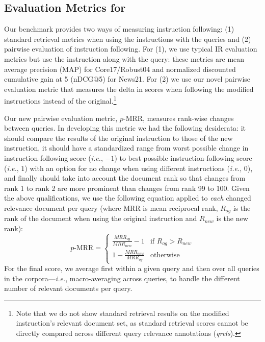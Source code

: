 \documentclass{article} %
\newcommand{\metricrank}{$p$-MRR}
\begin{document}
\subsection{Evaluation Metrics for \dataset}
Our benchmark provides two ways of measuring instruction following: (1) standard retrieval metrics when using the instructions with the queries and (2) pairwise evaluation of instruction following. For (1), we use typical IR evaluation metrics but use the instruction along with the query: these metrics are mean average precision (MAP) for Core17/Robust04 and normalized discounted cumulative gain at 5 (nDCG@5) for News21. For (2) we use our novel pairwise evaluation metric that measures the delta in scores when following the modified instructions instead of the original.\footnote{Note that we do not show standard retrieval results on the modified instruction's relevant document set, as standard retrieval scores cannot be directly compared across different query relevance annotations (\textit{qrels}).} 

Our new pairwise evaluation metric, \metricrank, measures rank-wise changes between queries. In developing this metric we had the following desiderata: it should compare the results of the original instruction to those of the new instruction, it should have a standardized range from worst possible change in instruction-following score (\textit{i.e.}, $-1$) to best possible instruction-following score (\textit{i.e.}, $1$) with an option for no change when using different instructions (\textit{i.e.}, $0$), and finally should take into account the document rank so that changes from rank 1 to rank 2 are more prominent than changes from rank 99 to 100. Given the above qualifications, we use the following equation applied to \textit{each} changed relevance document per query (where MRR is mean reciprocal rank, $R_{og}$ is the rank of the document when using the original instruction and $R_{new}$ is the new rank):
\begin{equation}
 \text{\metricrank} = 
  \begin{cases}
    \frac{MRR_{og}}{MRR_{new}} - 1 & \text{if $R_{og} > R_{new}$} \\[10pt]
   1 - \frac{MRR_{new}}{MRR_{og}} & \text{otherwise} 
  \end{cases}
\end{equation}
For the final score, we average first within a given query and then over all queries in the corpora---\textit{i.e.}, macro-averaging across queries, to handle the different number of relevant documents per query. 
\end{document}
